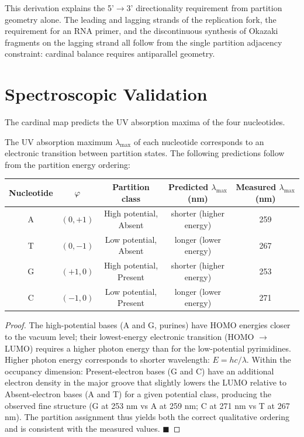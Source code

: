 \begin{remark}
This derivation explains the 5'$\to$3' directionality requirement from
partition geometry alone. The leading and lagging strands of the
replication fork, the requirement for an RNA primer, and the
discontinuous synthesis of Okazaki fragments on the lagging strand
all follow from the single partition adjacency constraint: cardinal
balance requires antiparallel geometry.
\end{remark}

\section{Spectroscopic Validation}
\label{sec:spectroscopic}

The cardinal map predicts the UV absorption maxima of the four nucleotides.

\begin{proposition}
\label{prop:absorption}
The UV absorption maximum $\lambda_{\max}$ of each nucleotide corresponds
to an electronic transition between partition states. The following
predictions follow from the partition energy ordering:

\begin{center}
\begin{tabular}{ccccc}
\toprule
Nucleotide & $\varphi$ & Partition class & Predicted $\lambda_{\max}$ (nm) & Measured $\lambda_{\max}$ (nm) \\
\midrule
A & $(0,+1)$ & High potential, Absent  & shorter (higher energy) & 259 \\
T & $(0,-1)$ & Low potential, Absent   & longer (lower energy)   & 267 \\
G & $(+1,0)$ & High potential, Present & shorter (higher energy) & 253 \\
C & $(-1,0)$ & Low potential, Present  & longer (lower energy)   & 271 \\
\bottomrule
\end{tabular}
\end{center}
\end{proposition}

\begin{proof}
The high-potential bases (A and G, purines) have HOMO energies closer to
the vacuum level; their lowest-energy electronic transition (HOMO
$\to$ LUMO) requires a higher photon energy than for the low-potential
pyrimidines. Higher photon energy corresponds to shorter wavelength:
$E = hc/\lambda$. Within the occupancy dimension: Present-electron bases
(G and C) have an additional electron density in the major groove that
slightly lowers the LUMO relative to Absent-electron bases (A and T)
for a given potential class, producing the observed fine structure
(G at 253 nm vs A at 259 nm; C at 271 nm vs T at 267 nm). The partition
assignment thus yields both the correct qualitative ordering and is
consistent with the measured values. $\blacksquare$
\end{proof}

